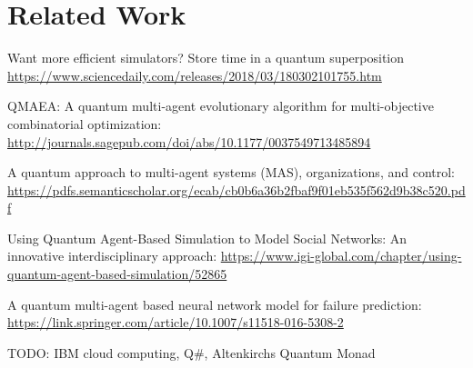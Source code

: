 \section{Related Work}
\label{sec:related_work}

Want more efficient simulators? Store time in a quantum superposition \url{https://www.sciencedaily.com/releases/2018/03/180302101755.htm}

QMAEA: A quantum multi-agent evolutionary algorithm for multi-objective combinatorial optimization: \url{http://journals.sagepub.com/doi/abs/10.1177/0037549713485894}

A quantum approach to multi-agent systems (MAS), organizations, and
control: \url{https://pdfs.semanticscholar.org/ecab/cb0b6a36b2fbaf9f01eb535f562d9b38c520.pdf}

Using Quantum Agent-Based Simulation to Model Social Networks: An innovative interdisciplinary approach: \url{https://www.igi-global.com/chapter/using-quantum-agent-based-simulation/52865}

A quantum multi-agent based neural network model for failure prediction: \url{https://link.springer.com/article/10.1007/s11518-016-5308-2}

TODO: IBM cloud computing, Q\#, Altenkirchs Quantum Monad